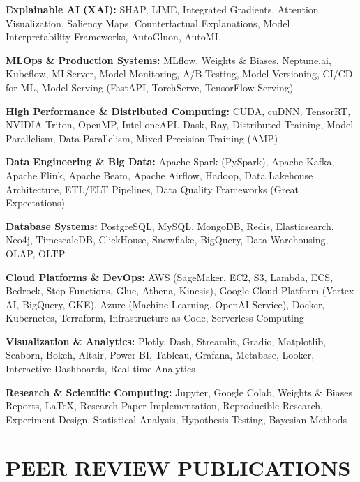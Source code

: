 \documentclass[10pt,a4paper]{article}
\begin{document}
\textbf{Explainable AI (XAI):} SHAP, LIME, Integrated Gradients, Attention Visualization, Saliency Maps, Counterfactual Explanations, Model Interpretability Frameworks, AutoGluon, AutoML

\textbf{MLOps \& Production Systems:} MLflow, Weights \& Biases, Neptune.ai, Kubeflow, MLServer, Model Monitoring, A/B Testing, Model Versioning, CI/CD for ML, Model Serving (FastAPI, TorchServe, TensorFlow Serving)

\textbf{High Performance \& Distributed Computing:} CUDA, cuDNN, TensorRT, NVIDIA Triton, OpenMP, Intel oneAPI, Dask, Ray, Distributed Training, Model Parallelism, Data Parallelism, Mixed Precision Training (AMP)

\textbf{Data Engineering \& Big Data:} Apache Spark (PySpark), Apache Kafka, Apache Flink, Apache Beam, Apache Airflow, Hadoop, Data Lakehouse Architecture, ETL/ELT Pipelines, Data Quality Frameworks (Great Expectations)

\textbf{Database Systems:} PostgreSQL, MySQL, MongoDB, Redis, Elasticsearch, Neo4j, TimescaleDB, ClickHouse, Snowflake, BigQuery, Data Warehousing, OLAP, OLTP

\textbf{Cloud Platforms \& DevOps:} AWS (SageMaker, EC2, S3, Lambda, ECS, Bedrock, Step Functions, Glue, Athena, Kinesis), Google Cloud Platform (Vertex AI, BigQuery, GKE), Azure (Machine Learning, OpenAI Service), Docker, Kubernetes, Terraform, Infrastructure as Code, Serverless Computing

\textbf{Visualization \& Analytics:} Plotly, Dash, Streamlit, Gradio, Matplotlib, Seaborn, Bokeh, Altair, Power BI, Tableau, Grafana, Metabase, Looker, Interactive Dashboards, Real-time Analytics

\textbf{Research \& Scientific Computing:} Jupyter, Google Colab, Weights \& Biases Reports, LaTeX, Research Paper Implementation, Reproducible Research, Experiment Design, Statistical Analysis, Hypothesis Testing, Bayesian Methods

\vspace{2pt}

\section*{PEER REVIEW PUBLICATIONS}
\end{document}
